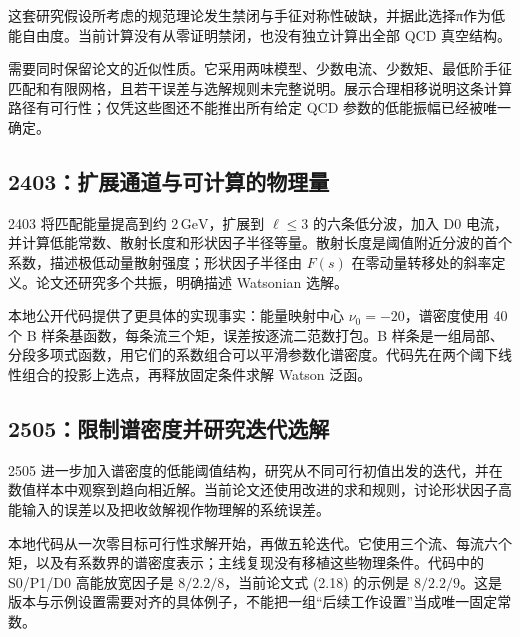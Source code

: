 \documentclass[UTF8,a4paper,11pt,fontset=fandol]{ctexart}
\numberwithin{equation}{section}
\newcommand{\GeV}{\,\mathrm{GeV}}
\begin{document}
这套研究假设所考虑的规范理论发生禁闭与手征对称性破缺，并据此选择π作为低能自由度。当前计算没有从零证明禁闭，也没有独立计算出全部 QCD 真空结构。

需要同时保留论文的近似性质。它采用两味模型、少数电流、少数矩、最低阶手征匹配和有限网格，且若干误差与选解规则未完整说明。展示合理相移说明这条计算路径有可行性；仅凭这些图还不能推出所有给定 QCD 参数的低能振幅已经被唯一确定。

\subsection{2403：扩展通道与可计算的物理量}
2403 将匹配能量提高到约 \(2\GeV\)，扩展到 \(\ell\le3\) 的六条低分波，加入 D0 电流，并计算低能常数、散射长度和形状因子半径等量。散射长度是阈值附近分波的首个系数，描述极低动量散射强度；形状因子半径由 \(F(s)\) 在零动量转移处的斜率定义。论文还研究多个共振，明确描述 Watsonian 选解。\cite{hk24}

本地公开代码提供了更具体的实现事实：能量映射中心 \(\nu_0=-20\)，谱密度使用 40 个 B 样条基函数，每条流三个矩，误差按逐流二范数打包。B 样条是一组局部、分段多项式函数，用它们的系数组合可以平滑参数化谱密度。代码先在两个阈下线性组合的投影上选点，再释放固定条件求解 Watson 泛函。\cite{code24}

\subsection{2505：限制谱密度并研究迭代选解}
2505 进一步加入谱密度的低能阈值结构，研究从不同可行初值出发的迭代，并在数值样本中观察到趋向相近解。当前论文还使用改进的求和规则，讨论形状因子高能输入的误差以及把收敛解视作物理解的系统误差。\cite{hk25}

本地代码从一次零目标可行性求解开始，再做五轮迭代。它使用三个流、每流六个矩，以及有系数界的谱密度表示；主线复现没有移植这些物理条件。代码中的 S0/P1/D0 高能放宽因子是 \(8/2.2/8\)，当前论文式 (2.18) 的示例是 \(8/2.2/9\)。这是版本与示例设置需要对齐的具体例子，不能把一组“后续工作设置”当成唯一固定常数。\cite{code25,hk25}
\end{document}
